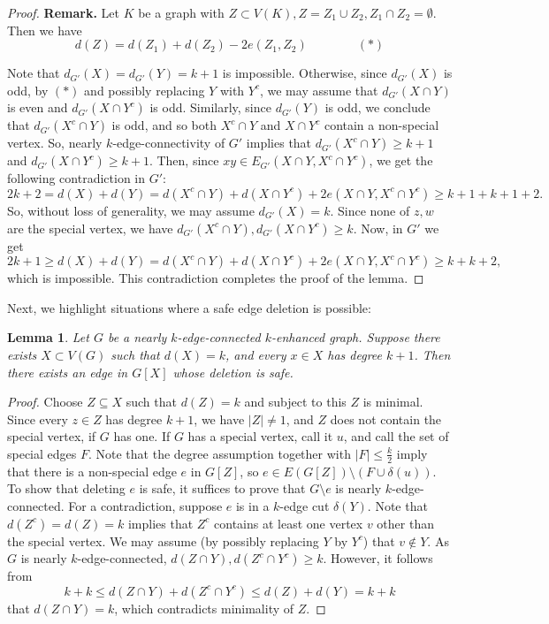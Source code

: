 \documentclass[letterpaper,11pt]{article}
\newtheorem{lemma}[theorem]{Lemma}
\theoremstyle{definition}
\begin{document}
\begin{proof}
	\bigskip
	\noindent \textbf{Remark.} Let $K$ be a graph with $Z \subset V(K), Z=Z_1 \cup Z_2, Z_1 \cap Z_2=\emptyset$. Then we have
	$$d(Z)=d(Z_1)+d(Z_2)-2e(Z_1, Z_2) \qquad  \qquad (*)$$
	
	
	Note that $d_{G'}(X) = d_{G'}(Y) = k+1$ is impossible. Otherwise, since $d_{G'}(X)$ is odd, by $(*)$ and possibly replacing $Y$ with $Y^c$, we may assume that $d_{G'}(X \cap Y)$ is even and $d_{G'}(X \cap Y^c)$ is odd. Similarly, since $d_{G'}(Y)$ is odd, we conclude that $d_{G'}(X^c \cap Y)$ is odd, and so both $X^c \cap Y$ and $X\cap Y^c$ contain a non-special vertex. So, nearly $k$-edge-connectivity of $G'$ implies that $d_{G'}(X^c\cap Y)\ge k+1$ and $d_{G'}(X\cap Y^c) \ge k+1$. Then, since $xy\in E_{G'}(X\cap Y, X^c\cap Y^c)$, we get the following contradiction in $G'$:
	$$2k+2 = d(X)+d(Y) = d(X^c\cap Y)+ d(X\cap Y^c) +2 e(X\cap Y, X^c\cap Y^c)\ge k+1+k+1+2.$$
	So, without loss of generality, we may assume $d_{G'}(X) =k$. Since none of $z, w$ are the special vertex, we have $d_{G'}(X^c\cap Y), d_{G'}(X \cap Y^c) \ge k$. Now, in $G'$ we get
	$$2k+1 \ge d(X)+ d(Y) = d(X^c\cap Y)+ d(X\cap Y^c) +2 e(X\cap Y, X^c\cap Y^c)\ge k+k+2,$$
	which is impossible. This contradiction completes the proof of the lemma.
\end{proof}




Next, we highlight situations where a safe edge deletion is possible: 


\begin{lemma}
\label{lem1}
 Let $G$ be a nearly $k$-edge-connected $k$-enhanced graph. Suppose there exists $X \subset V(G)$ such that $ d(X) = k$, and every $x \in X$ has degree $k+1$.  Then there exists an edge in $G[X]$  
 whose deletion is safe.
\end{lemma}



\begin{proof}
Choose $Z\subseteq X$ such that $d(Z)=k$ and subject to this $Z$ is minimal. Since every $z \in Z$ has degree $k+1$, we have $|Z|\neq 1$, and $Z$ does not contain the special vertex,  if $G$ has one. If $G$ has a special vertex, call it $u$, and call the set of special edges $F$. Note that the degree assumption together with $|F| \le \frac{k}{2}$ imply that there is a non-special edge $e$ in $G[Z]$, so $e \in E(G[Z])\setminus (F \cup \delta(u))$.  To show that deleting $e$ is safe, it suffices to prove that $G\setminus e$ is nearly $k$-edge-connected. For a contradiction, suppose $e$ is in a $k$-edge cut $\delta (Y)$.
Note that $d(Z^c)=d(Z)=k$ implies that $Z^c$ contains at least one vertex $v$ other than the special vertex. We may assume (by possibly replacing $Y$ by $Y^c$) that $v\notin Y$. As $G$ is nearly $k$-edge-connected, $d(Z \cap Y), d({Z}^c \cap Y^c)\geq k$. However, it follows from
$$k+k\leq d(Z \cap Y) +d(Z^c \cap Y^c)\leq d(Z)+d(Y)=k+k$$
that $d(Z\cap Y)=k$, which contradicts minimality of $Z$.
\end{proof}
\end{document}
